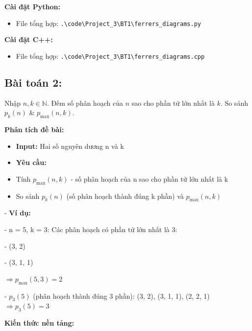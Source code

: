 \documentclass[12pt,a4paper]{article}
\begin{document}
\textbf{Cài đặt Python:}
\begin{itemize}[label=\textbullet]
   \item File tổng hợp: \texttt{.\textbackslash code\textbackslash Project\_3\textbackslash BT1\textbackslash ferrers\_diagrams.py}
\end{itemize}

\textbf{Cài đặt C++:}
\begin{itemize}[label=\textbullet]
   \item File tổng hợp: \texttt{.\textbackslash code\textbackslash Project\_3\textbackslash BT1\textbackslash ferrers\_diagrams.cpp}
\end{itemize}
\newpage

\subsection{Bài toán 2:}

\begin{problembox}
Nhập $n, k \in \mathbb{N}$. Đếm số phân hoạch của $n$ sao cho phần tử lớn nhất là $k$. So sánh $p_k(n)$ \& $p_{\max}(n, k)$.

\end{problembox}

\textbf{Phân tích đề bài:}


\begin{itemize}[label=\textbullet]
    \item \textbf{Input:} Hai số nguyên dương n và k
    \item \textbf{Yêu cầu:}
    \item Tính $p_{\max}(n, k)$ - số phân hoạch của n sao cho phần tử lớn nhất là k
    \item So sánh $p_k(n)$ (số phân hoạch thành đúng k phần) và $p_{\max}(n, k)$

\end{itemize}

- \textbf{Ví dụ:}
        
            
- n = 5, k = 3: Các phân hoạch có phần tử lớn nhất là 3:
                
                    
- (3, 2)
                    
- (3, 1, 1)
                
                $\Rightarrow p_{\max}(5, 3) = 2$
            
- $p_3(5)$ (phân hoạch thành đúng 3 phần): (3, 2), (3, 1, 1), (2, 2, 1)
                $\Rightarrow p_3(5) = 3$

\vspace{0.5cm}
\textbf{Kiến thức nền tảng:}
\end{document}
